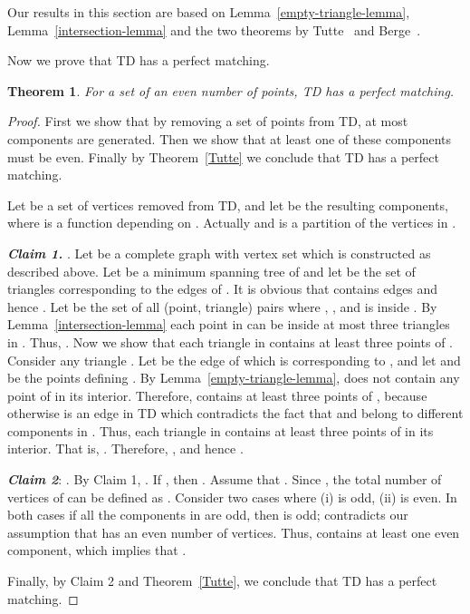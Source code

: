 \documentclass[11pt,a4paper]{article}
\newcommand{\kTD}[2]{\text{-}TD#2}
\newtheorem{theorem}{Theorem}
\begin{document}
Our results in this section are based on Lemma~\ref{empty-triangle-lemma}, Lemma~\ref{intersection-lemma} and the two theorems by Tutte~\cite{Tutte1947} and Berge~\cite{Berge1958}. 

Now we prove that \kTD{2}{} has a perfect matching.

\begin{theorem}
 \label{mt-thr}
For a set  of an even number of points, \kTD{2}{} has a perfect matching.
\end{theorem}
\begin{proof}
First we show that by removing a set  of  points from \kTD{2}{}, at most  components are generated. Then we show that at least one of these components must be even. Finally by Theorem~\ref{Tutte} we conclude that \kTD{2}{} has a perfect matching.

Let  be a set of  vertices removed from \kTD{2}{}, and let  be the resulting  components, where  is a function depending on . Actually  and  is a partition of the vertices in . 

{\bf\em  Claim 1.} . Let  be a complete graph with vertex set  which is constructed as described above. Let  be a minimum spanning tree of  and let  be the set of triangles corresponding to the edges of . It is obvious that  contains  edges and hence . Let  be the set of all (point, triangle) pairs where , , and  is inside . By Lemma~\ref{intersection-lemma} each point in  can be inside at most three triangles in . Thus, .
Now we show that each triangle in  contains at least three points of .  
Consider any triangle . Let  be the edge of  which is corresponding to , and let  and  be the points defining . By Lemma~\ref{empty-triangle-lemma},  does not contain any point of  in its interior. Therefore,  contains at least three points of , because otherwise  is an edge in \kTD{2}{} which contradicts the fact that  and  belong to different components in . Thus, each triangle in  contains at least three points of  in its interior. That is, . Therefore, , and hence .

{\bf \em Claim 2}: . By Claim 1, . If , then . Assume that . Since , the total number of vertices of  can be defined as . Consider two cases where (i)  is odd, (ii)  is even. In both cases if all the components in  are odd, then  is odd; contradicts our assumption that  has an even number of vertices. Thus,  contains at least one even component, which implies that .

Finally, by Claim 2 and Theorem~\ref{Tutte}, we conclude that \kTD{2}{} has a perfect matching.
\end{proof}
\end{document}
